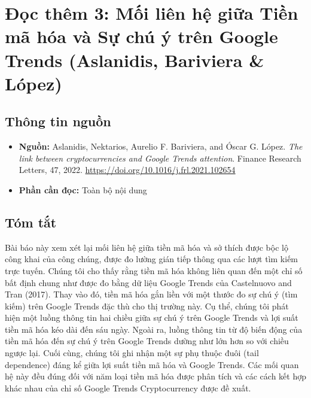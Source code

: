 \chapter{Đọc thêm 3: Mối liên hệ giữa Tiền mã hóa và Sự chú ý trên Google Trends (Aslanidis, Bariviera \& López)}
\label{ch:M4L2DT3}


\section{Thông tin nguồn}

\begin{itemize}
  \item \textbf{Nguồn:} Aslanidis, Nektarios, Aurelio F. Bariviera, and Óscar G. López. \emph{The link between cryptocurrencies and Google Trends attention}. Finance Research Letters, 47, 2022. \url{https://doi.org/10.1016/j.frl.2021.102654}
  \item \textbf{Phần cần đọc:} Toàn bộ nội dung
\end{itemize}

\section{Tóm tắt}

Bài báo này xem xét lại mối liên hệ giữa tiền mã hóa và sở thích được bộc lộ công khai của công chúng, được đo lường gián tiếp thông qua các lượt tìm kiếm trực tuyến. Chúng tôi cho thấy rằng tiền mã hóa không liên quan đến một chỉ số bất định chung như được đo bằng dữ liệu Google Trends của Castelnuovo and Tran (2017). Thay vào đó, tiền mã hóa gắn liền với một thước đo sự chú ý (tìm kiếm) trên Google Trends đặc thù cho thị trường này. Cụ thể, chúng tôi phát hiện một luồng thông tin hai chiều giữa sự chú ý trên Google Trends và lợi suất tiền mã hóa kéo dài đến sáu ngày. Ngoài ra, luồng thông tin từ độ biến động của tiền mã hóa đến sự chú ý trên Google Trends dường như lớn hơn so với chiều ngược lại. Cuối cùng, chúng tôi ghi nhận một sự phụ thuộc đuôi (tail dependence) đáng kể giữa lợi suất tiền mã hóa và Google Trends. Các mối quan hệ này đều đúng đối với năm loại tiền mã hóa được phân tích và các cách kết hợp khác nhau của chỉ số Google Trends Cryptocurrency được đề xuất.

